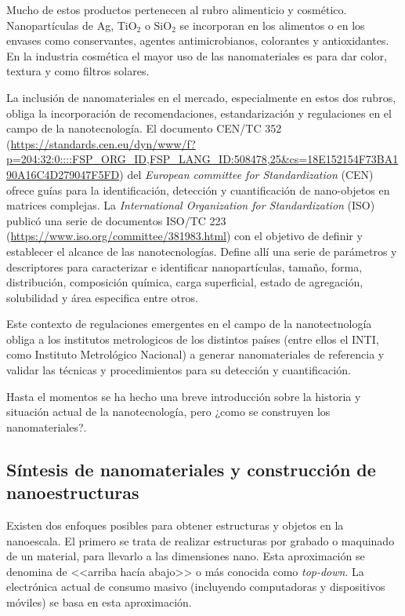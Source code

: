  	Mucho de estos productos pertenecen al rubro alimenticio y cosmético. Nanopartículas de Ag, TiO$_2$ o SiO$_2$ se incorporan en los alimentos o en los envases como conservantes, agentes antimicrobianos, colorantes y antioxidantes. En la industria cosmética el mayor uso de las nanomateriales es para dar color, textura y como filtros solares.
 	
 	La inclusión de nanomateriales en el mercado, especialmente en estos dos rubros, obliga la incorporación de recomendaciones, estandarización y regulaciones en el campo de la nanotecnología.  El documento CEN/TC 352 (\url{https://standards.cen.eu/dyn/www/f?p=204:32:0::::FSP_ORG_ID,FSP_LANG_ID:508478,25&cs=18E152154F73BA190A16C4D279047F5FD}) del \textit{European committee for Standardization} (CEN) ofrece guías para la identificación, detección y cuantificación de nano-objetos en matrices complejas. La \textit{International Organization for Standardization} (ISO) publicó una serie de documentos ISO/TC 223 (\url{https://www.iso.org/committee/381983.html}) con el objetivo de definir y establecer el alcance de las nanotecnologías. Define allí una serie de parámetros y descriptores para caracterizar e identificar nanopartículas, tamaño, forma, distribución, composición química, carga superficial, estado de agregación, solubilidad y área especifica entre otros.

 	Este contexto de regulaciones emergentes en el campo de la nanotectnología obliga a los institutos metrologicos de los distintos países (entre ellos el INTI, como Instituto Metrológico Nacional) a generar nanomateriales de referencia y validar las técnicas y procedimientos para su detección y cuantificación.

 	Hasta el momentos se ha hecho una breve introducción sobre la historia y situación actual de la nanotecnología, pero ¿como se construyen los nanomateriales?.

	
 	\subsection{Síntesis de nanomateriales y construcción de nanoestructuras}

	Existen dos enfoques posibles para obtener estructuras y objetos en la nanoescala. El primero se trata de realizar estructuras por grabado o maquinado de un material, para llevarlo a las dimensiones nano. Esta aproximación se denomina de <<arriba hacía abajo>> o más conocida como \textit{top-down}. La electrónica actual de consumo masivo (incluyendo computadoras y dispositivos móviles) se basa en esta aproximación. 

